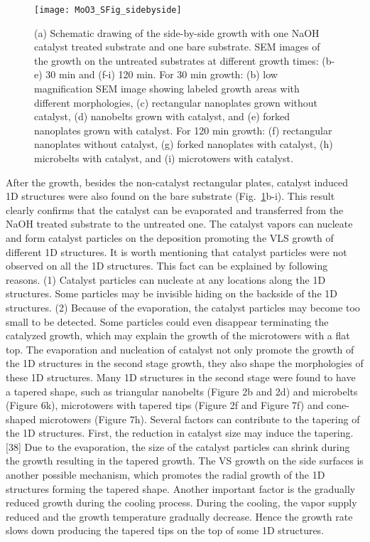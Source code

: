 \begin{figure}[htb]
\centering
\texttt{[image: MoO3\_SFig\_sidebyside]}
\caption[side by side growth of ]{(a) Schematic drawing of the side-by-side growth with one NaOH catalyst treated substrate and one bare substrate. SEM images of the growth on the untreated substrates at different growth times: (b-e) 30 min and (f-i) 120 min. For 30 min growth: (b) low magnification SEM image showing labeled growth areas with different morphologies, (c) rectangular nanoplates grown without catalyst, (d) nanobelts grown with catalyst, and (e) forked nanoplates grown with catalyst. For 120 min growth: (f) rectangular nanoplates without catalyst, (g) forked nanoplates with catalyst, (h) microbelts with catalyst, and (i) microtowers with catalyst.}
\label{fig:ch4sbs}
\end{figure}

After the growth, besides the non-catalyst rectangular plates, catalyst induced 1D structures were also found on the bare substrate (Fig.~\ref{fig:ch4sbs}b-i). This result clearly confirms that the catalyst can be evaporated and transferred from the NaOH treated substrate to the untreated one. The catalyst vapors can nucleate and form catalyst particles on the  deposition promoting the VLS growth of different 1D structures. It is worth mentioning that catalyst particles were not observed on all the 1D structures. This fact can be explained by following reasons. (1) Catalyst particles can nucleate at any locations along the 1D structures. Some particles may be invisible hiding on the backside of the 1D structures. (2) Because of the evaporation, the catalyst particles may become too small to be detected. Some particles could even disappear terminating the catalyzed growth, which may explain the growth of the microtowers with a flat top. The evaporation and nucleation of catalyst not only promote the growth of the 1D structures in the second stage growth, they also shape the morphologies of these 1D structures. Many 1D structures in the second stage were found to have a tapered shape, such as triangular nanobelts (Figure 2b and 2d) and microbelts (Figure 6k), microtowers with tapered tips (Figure 2f and Figure 7f) and cone-shaped microtowers (Figure 7h). Several factors can contribute to the tapering of the 1D structures. First, the reduction in catalyst size may induce the tapering.[38] Due to the evaporation, the size of the catalyst particles can shrink during the growth resulting in the tapered growth. The VS growth on the side surfaces is another possible mechanism, which promotes the radial growth of the 1D structures forming the tapered shape. Another important factor is the gradually reduced growth during the cooling process. During the cooling, the  vapor supply reduced and the growth temperature gradually decrease. Hence the growth rate slows down producing the tapered tips on the top of some 1D structures.



